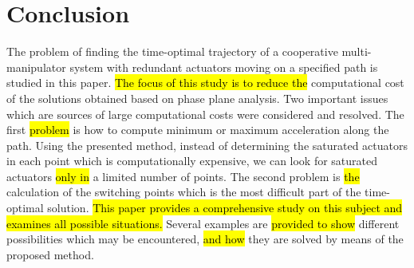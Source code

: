 \documentclass{rob}%
\begin{document}
\section{Conclusion}
The problem of finding the time-optimal trajectory of a cooperative multi-manipulator system with redundant actuators moving on a specified path is studied in this paper. \hl{The focus of this study is to reduce the} computational cost of the solutions obtained based on phase plane analysis. Two important issues which are sources of large computational costs were considered and resolved. The first \hl{problem} is how to compute minimum or maximum acceleration along the path. Using the presented method, instead of determining the saturated actuators in each point which is computationally expensive, we can look for saturated actuators \hl{only in} a limited number of points. The second problem is \hl{the} calculation of the switching points which is the most difficult part of the time-optimal solution. 
\hl{This paper provides a comprehensive study on this subject and examines all possible situations.} 
Several examples are \hl{provided to show} different possibilities which may be encountered, \hl{and how} they are solved by means of the proposed method.
\end{document}
